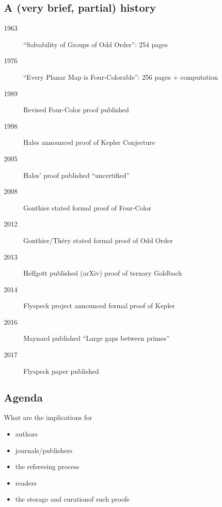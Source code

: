 \subsection{A (very brief, partial) history}
\begin{description}
	\item[1963]``Solvability of Groups of Odd Order'': 254 pages \cite{FeitThompson1963}
	\item[1976]``Every Planar Map is Four-Colorable'': 256 pages + computation \cite{AppelHaken1976a}
	\item[1989]Revised Four-Color proof published \cite{AppelHaken1989}
\item[1998]Hales announced proof of Kepler Conjecture
\item[2005]Hales' proof published ``uncertified'' \cite{Hales2005}
\item[2008]Gonthier stated formal proof of Four-Color \cite{Gonthier2008}
\item[2012]Gonthier/Th\'ery stated formal proof of Odd Order \cite{GonthierThery2012a}
\item[2013]Helfgott published (arXiv) proof of ternary Goldbach \cite{Helfgott2013a}
\item[2014]Flyspeck project announced formal proof of Kepler \cite{Hales2014a}
\item[2016]Maynard published ``Large gaps between primes'' \cite{Maynard2016a}
\item[2017]Flyspeck paper published \cite{Halesetal2017a}
\end{description}
	\subsection{Agenda}
What are the implications for
\begin{itemize}
	\item authors
	\item journals/publishers
	\item the refereeing process
	\item readers
\item the storage and curationof such proofs  %
\end{itemize}

